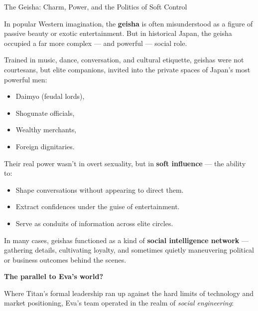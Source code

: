 \begin{HistoricalSidebar}{The Geisha: Charm, Power, and the Politics of Soft Control}

    In popular Western imagination, the \textbf{geisha} is often misunderstood as a figure of passive beauty or exotic entertainment.  
    But in historical Japan, the geisha occupied a far more complex — and powerful — social role.
    
    \medskip
    
    Trained in music, dance, conversation, and cultural etiquette, geishas were not courtesans, but elite companions, invited into the private spaces of Japan’s most powerful men:  

    \medskip

    \begin{itemize}
        \item Daimyo (feudal lords),
        \item Shogunate officials,
        \item Wealthy merchants,
        \item Foreign dignitaries.
    \end{itemize}
    
    \medskip
    
    Their real power wasn’t in overt sexuality, but in \textbf{soft influence} — the ability to:

    \medskip

    \begin{itemize}
        \item Shape conversations without appearing to direct them.
        \item Extract confidences under the guise of entertainment.
        \item Serve as conduits of information across elite circles.
    \end{itemize}
    
    \medskip
    
    In many cases, geishas functioned as a kind of \textbf{social intelligence network} —  
    gathering details, cultivating loyalty, and sometimes quietly maneuvering political or business outcomes behind the scenes.
    
    \medskip
    
    \textbf{The parallel to Eva’s world?}
    
    Where Titan’s formal leadership ran up against the hard limits of technology and market positioning, Eva’s team operated in the realm of \textit{social engineering}:


\end{HistoricalSidebar}
